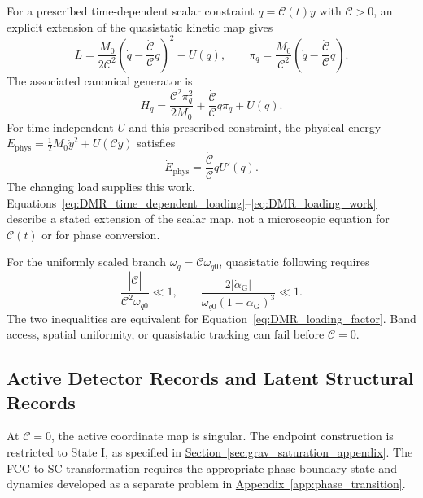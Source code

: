 For a prescribed time-dependent scalar constraint $q=\mathcal C(t)y$ with $\mathcal C>0$, an explicit extension of the quasistatic kinetic map gives
\begin{equation}
 L=\frac{M_0}{2\mathcal C^2}
 \left(\dot q-\frac{\dot{\mathcal C}}{\mathcal C}q\right)^2-U(q),
 \qquad
 \pi_q=\frac{M_0}{\mathcal C^2}\left(\dot q-\frac{\dot{\mathcal C}}{\mathcal C}q\right).
\label{eq:DMR_time_dependent_loading}
\end{equation}
The associated canonical generator is
\begin{equation}
 H_q=\frac{\mathcal C^2\pi_q^2}{2M_0}+\frac{\dot{\mathcal C}}{\mathcal C}q\pi_q+U(q).
\label{eq:DMR_loading_generator}
\end{equation}
For time-independent $U$ and this prescribed constraint, the physical energy $E_{\mathrm{phys}}=\tfrac12M_0\dot y^2+U(\mathcal C y)$ satisfies
\begin{equation}
 \dot E_{\mathrm{phys}}=\frac{\dot{\mathcal C}}{\mathcal C}qU'(q).
\label{eq:DMR_loading_work}
\end{equation}
The changing load supplies this work. Equations~\eqref{eq:DMR_time_dependent_loading}--\eqref{eq:DMR_loading_work} describe a stated extension of the scalar map, not a microscopic equation for $\mathcal C(t)$ or for phase conversion.

For the uniformly scaled branch $\omega_q=\mathcal C\omega_{q0}$, quasistatic following requires
\begin{equation}
 \boxed{
 \frac{|\dot{\mathcal C}|}{\mathcal C^2\omega_{q0}}\ll1,
 \qquad
 \frac{2|\dot\alpha_{\mathrm G}|}
 {\omega_{q0}(1-\alpha_{\mathrm G})^3}\ll1
 }.
\label{eq:DMR_quasistatic_limit}
\end{equation}
The two inequalities are equivalent for Equation~\eqref{eq:DMR_loading_factor}. Band access, spatial uniformity, or quasistatic tracking can fail before $\mathcal C=0$.

\subsection{Active Detector Records and Latent Structural Records}

At $\mathcal C=0$, the active coordinate map is singular. The endpoint construction is restricted to State I, as specified in \hyperref[sec:grav_saturation_appendix]{Section~\ref*{sec:grav_saturation_appendix}}. The FCC-to-SC transformation requires the appropriate phase-boundary state and dynamics developed as a separate problem in \hyperref[app:phase_transition]{Appendix~\ref*{app:phase_transition}}.

